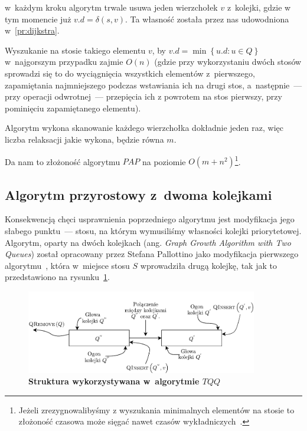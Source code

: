 \begin{myitemize}
	\item w~każdym kroku algorytm trwale usuwa jeden wierzchołek $v$ z~kolejki, gdzie w tym momencie już $v.d = \delta \left( s, v \right)$. Ta własność została przez nas udowodniona w~\ref{pr:dijkstra}.
	\item Wyszukanie na stosie takiego elementu $v$, by $v.d = \min \left\{ u.d : u \in Q \right\}$ w~najgorszym przypadku zajmie $O \left( n \right)$ (gdzie przy wykorzystaniu dwóch stosów sprowadzi się to do wyciągnięcia wszystkich elementów z~pierwszego, zapamiętania najmniejszego podczas wstawiania ich na drugi stos, a~następnie~--- przy operacji odwrotnej~--- przepięcia ich z powrotem na stos pierwszy, przy pominięciu zapamiętanego elementu).
	\item Algorytm wykona skanowanie każdego wierzchołka dokładnie jeden raz, więc liczba relaksacji jakie wykona, będzie równa $m$.
\end{myitemize}

Da nam to złożoność algorytmu $PAP$ na poziomie $O \left( m + n^{2} \right)$\footnote{
	Jeżeli zrezygnowalibyśmy z wyszukania minimalnych elementów na stosie to złożoność czasowa może sięgać nawet czasów wykładniczych~\cite[$4$]{GIDA}.
}.



\subsection{Algorytm przyrostowy z~dwoma kolejkami}



Konsekwencją chęci usprawnienia poprzedniego algorytmu jest modyfikacja jego słabego punktu~--- stosu, na którym wymusiliśmy własności kolejki priorytetowej.
Algorytm, oparty na dwóch kolejkach (ang. \textit{Graph Growth Algorithm with Two Queues}) został opracowany przez Stefana Pallottino jako modyfikacja pierwszego algorytmu~\cite[$4.$]{GIDA}, która w~miejsce stosu $S$ wprowadziła drugą kolejkę, tak jak to przedstawiono na rysunku~\ref{fig:exampleTQQStructure}.

\begin{figure}[!htbp]
	\centering
	\null\hfill
	\includegraphics[width=0.9\textwidth]{Chapter_III/GRAPH-GROWTH-2Q-Other/a.pdf}
	\hfill\null
	\caption{
		\textbf{Struktura wykorzystywana w~algorytmie $TQQ$}
	}
	\label{fig:exampleTQQStructure}
\end{figure}

